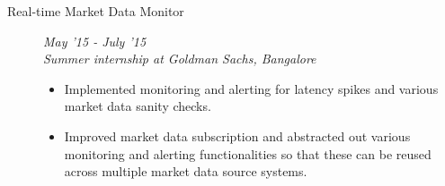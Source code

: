 \documentclass[9pt]{article}
\newenvironment{changemargin}[2]{%
  \begin{list}{}{%
    \setlength{\topsep}{0pt}%
    \setlength{\leftmargin}{#1}%
    \setlength{\rightmargin}{#2}%
    \setlength{\listparindent}{\parindent}%
    \setlength{\itemindent}{\parindent}%
    \setlength{\parsep}{\parskip}%
  }%
  \item[]}{\end{list}
}
\newenvironment{body} {
	\vspace*{-16pt}
	\begin{changemargin}{-0.6in}{-0.65in}
  }	
	{\end{changemargin}
}
\begin{document}
\begin{body}
\begin{description}
  \item[\normalsize{Real-time Market Data Monitor}] \hfill \textit{May '15 - July '15} \\
  \textit{Summer internship at Goldman Sachs, Bangalore} 
  \begin{itemize}
   \item Implemented monitoring and alerting for latency spikes and various market data sanity checks.
   \item Improved market data subscription and abstracted out various monitoring and alerting functionalities so that these can be reused across multiple market data source systems.
  \end{itemize}

  \end{description}
  
\end{body}
\end{document}
